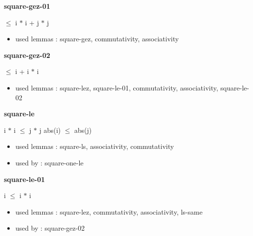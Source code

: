 \documentclass[a4paper]{article}
\begin{document}
\medskip

\bigskip

{\large\bf square-gez-01}

\medskip

  $\le$ i $*$ i + j $*$ j

\begin{itemize}


\item       used lemmas  : square-gez, commutativity, associativity

\end{itemize}

\medskip

\bigskip

{\large\bf square-gez-02}

\medskip

  $\le$ i + i $*$ i

\begin{itemize}


\item       used lemmas  : square-lez, square-le-01, commutativity, associativity, square-le-02

\end{itemize}

\medskip

\bigskip

{\large\bf square-le}

\medskip

 \Fol i $*$ i $\le$ j $*$ j \Equiv abs(i) $\le$ abs(j)

\begin{itemize}


\item       used lemmas  : square-ls, associativity, commutativity
\item       used by      : square-one-le

\end{itemize}

\medskip

\bigskip

{\large\bf square-le-01}

\medskip

 \Fol i $\le$ i $*$ i

\begin{itemize}


\item       used lemmas  : square-lez, commutativity, associativity, ls-same
\item       used by      : square-gez-02

\end{itemize}
\end{document}
